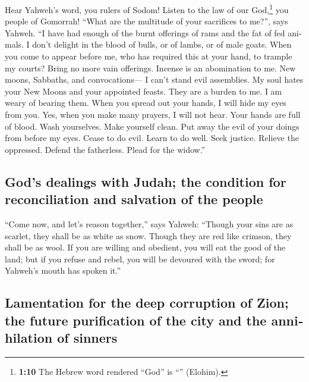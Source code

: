\begin{paracol}{2}
\begin{otherlanguage}{english}
 Hear Yahweh's word, you rulers of Sodom! Listen to the
law of our God,\footnote{\textbf{1:10} The Hebrew word rendered ``God''
  is ``'' (Elohim).} you people of Gomorrah!
 ``What are the multitude of your sacrifices to me?'',
says Yahweh. ``I have had enough of the burnt offerings of rams and the
fat of fed animals. I don't delight in the blood of bulls, or of lambs,
or of male goats.  When you come to appear before me, who
has required this at your hand, to trample my courts? 
Bring no more vain offerings. Incense is an abomination to me. New
moons, Sabbaths, and convocations--- I can't stand evil assemblies.
 My soul hates your New Moons and your appointed feasts.
They are a burden to me. I am weary of bearing them. 
When you spread out your hands, I will hide my eyes from you. Yes, when
you make many prayers, I will not hear. Your hands are full of blood.
 Wash yourselves. Make yourself clean. Put away the evil
of your doings from before my eyes. Cease to do evil. 
Learn to do well. Seek justice. Relieve the oppressed. Defend the
fatherless. Plead for the widow.''

\hypertarget{gods-dealings-with-judah-the-condition-for-reconciliation-and-salvation-of-the-people}{%
\subsection{God's dealings with Judah; the condition for reconciliation
and salvation of the
people}\label{gods-dealings-with-judah-the-condition-for-reconciliation-and-salvation-of-the-people}}

 ``Come now, and let's reason together,'' says Yahweh:
``Though your sins are as scarlet, they shall be as white as snow.
Though they are red like crimson, they shall be as wool. 
If you are willing and obedient, you will eat the good of the land;
 but if you refuse and rebel, you will be devoured with
the sword; for Yahweh's mouth has spoken it.''

\hypertarget{lamentation-for-the-deep-corruption-of-zion-the-future-purification-of-the-city-and-the-annihilation-of-sinners}{%
\subsection{Lamentation for the deep corruption of Zion; the future
purification of the city and the annihilation of
sinners}\label{lamentation-for-the-deep-corruption-of-zion-the-future-purification-of-the-city-and-the-annihilation-of-sinners}}


\end{otherlanguage}
\end{paracol}
